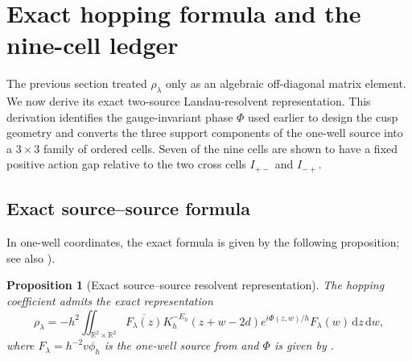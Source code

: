 \documentclass[11pt]{article}
\newtheorem{proposition}[theorem]{Proposition}
\newcommand{\R}{\mathbb R}
\newcommand{\dd}{\,\mathrm d}
\begin{document}
\section{Exact hopping formula and the nine-cell ledger}\label{sec:exact-hopping}

The previous section treated $\rho_\lambda$ only as an algebraic off-diagonal
matrix element.  We now derive its exact two-source Landau-resolvent representation.  This
derivation identifies the gauge-invariant phase $\Phi$ used earlier to design the
cusp geometry and converts the three support components of the one-well
source into a $3\times3$ family of ordered cells. Seven of the nine cells are shown to have a fixed positive action gap relative to the two cross cells $I_{+-}$ and $I_{-+}$.

\subsection{Exact source--source formula}\label{sec:framework-exact}
In one-well coordinates, the exact formula is given by the following proposition; 
{see also \cite[eqn (2.29)]{FSW-absence})}.

\begin{proposition}[Exact source--source resolvent representation]
\label{prop:hopping-derivation}
The hopping coefficient admits the exact representation
\begin{equation}\label{eq:exact-source-cell-total}
 \rho_\lambda
 =-h^2\iint_{\R^2\times\R^2}
 \overline{F_\lambda(z)}
 K_h^{-E_h}(z+w-2d)
 e^{i\Phi(z,w)/h}
 F_\lambda(w)\dd z\dd w,
\end{equation}
where $F_\lambda=h^{-2}v\phi_h$ is the one-well source
from  and $\Phi$ is given by
.
\end{proposition}
\end{document}
